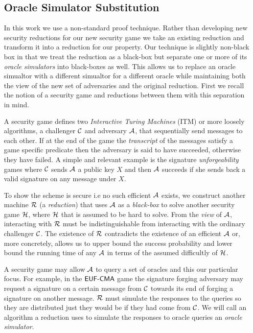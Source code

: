 

\subsection{Oracle Simulator Substitution}

In this work we use a non-standard proof technique.
Rather than developing new security reductions for our new security game we take an existing reduction and transform it into a reduction for our property.
Our technique is slightly non-black box in that we treat the reduction as a black-box but separate one or more of its \emph{oracle simulators} into black-boxes as well.
This allows us to replace an oracle simualtor with a different simualtor for a different oracle while maintaining both the view of the new set of adversaries and the original reduction.
First we recall the notion of a security game and reductions between them with this separation in mind.

A security game defines two \emph{Interactive Turing Machines} (ITM) or more loosely algorithms, a challenger $\mathcal{C}$ and adversary $\mathcal{A}$, that sequentially send messages to each other.
If at the end of the game the \emph{transcript} of the messages satisfy a game specific predicate then the adversary is said to have succeeded, otherwise they have failed.
A simple and relevant example is the signature \emph{unforgeability} games where $\mathcal{C}$ sends $\mathcal{A}$ a public key $X$ and then $\mathcal{A}$ succeeds if she sends back a valid signature on any message under $X$.

To show the scheme is secure i.e no such efficient $\mathcal{A}$ exists, we construct another machine $\mathcal{R}$ (a \emph{reduction}) that uses $\mathcal{A}$ as a \emph{black-box} to solve another security game $\mathcal{H}$, where $\mathcal{H}$ that is assumed to be hard to solve.
From the \emph{view} of $\mathcal{A}$, interacting with $\mathcal{R}$ must be indistinguishable from interacting with the ordinary challenger $\mathcal{C}$.
The existence of $\mathcal{R}$ contradicts the existence of an efficient $\mathcal{A}$ or, more concretely, allows us to upper bound the success probability and lower bound the running time of any $\mathcal{A}$ in terms of the assumed difficultly of $\mathcal{H}$.

A security game may allow $\mathcal{A}$ to query a set of oracles and this our particular focus.
For example, in the $\textsf{EUF-CMA}$ game the signature forging adversary may request a signature on a certain message from $\mathcal{C}$  towards its end of forging a signature on another message.
$\mathcal{R}$ must simulate the responses to the queries so they are distributed just they would be if they had come from $\mathcal{C}$.
We will call an algorithm a reduction uses to simulate the responses to oracle queries an \emph{oracle simulator}.





